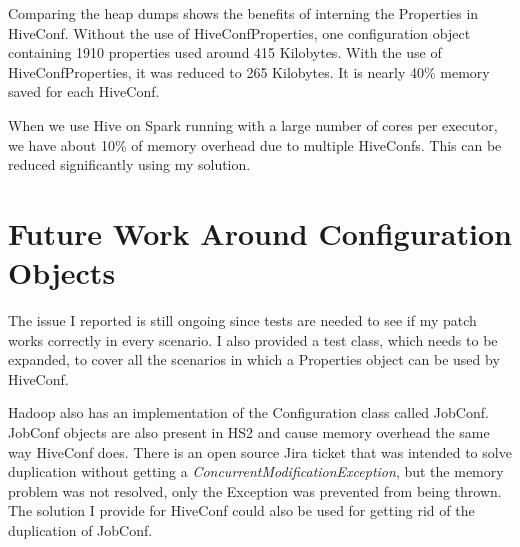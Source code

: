 Comparing the heap dumps shows the benefits of interning the Properties in HiveConf. Without the use of HiveConfProperties, one configuration object containing 1910 properties used around 415 Kilobytes. With the use of HiveConfProperties, it was reduced to 265 Kilobytes. It is nearly 40\% memory saved for each HiveConf. 

When we use Hive on Spark running with a large number of cores per executor, we have about 10\% of memory overhead due to multiple HiveConfs. This can be reduced significantly using my solution. 

\section{Future Work Around Configuration Objects}
The issue I reported is still ongoing since tests are needed to see if my patch works correctly in every scenario. I also provided a test class, which needs to be expanded, to cover all the scenarios in which a Properties object can be used by HiveConf. 

Hadoop also has an implementation of the Configuration class called JobConf. JobConf objects are also present in HS2 and cause memory overhead the same way HiveConf does. There is an open source Jira ticket that was intended to solve duplication without getting a \textit{ConcurrentModificationException}, but the memory problem was not resolved, only the Exception was prevented from being thrown\cite{hive-jobconf}. The solution I provide for HiveConf could also be used for getting rid of the duplication of JobConf.
